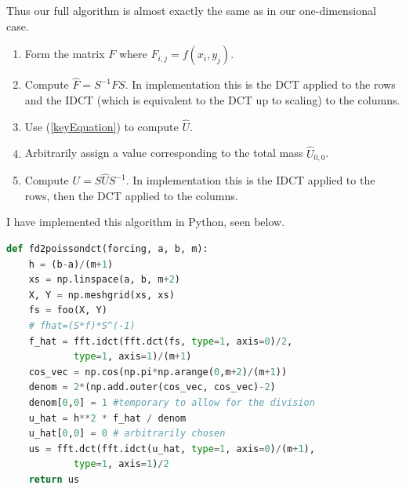 \documentclass[12pt]{article}
\begin{document}
Thus our full algorithm is almost exactly the same as in our one-dimensional case.
\begin{enumerate}
	\item Form the matrix $F$ where $F_{i,j} = f(x_i, y_j)$.
	\item Compute $\hat{F} = S^{-1}FS$. In implementation this is the DCT applied to the rows and the IDCT (which is equivalent to the DCT up to scaling) to the columns. 
	\item Use (\ref{keyEquation}) to compute $\hat{U}$.
	\item Arbitrarily assign a value corresponding to the total mass $\hat{U}_{0,0}$.
	\item Compute $U = S\hat{U}S^{-1}$. In implementation this is the IDCT applied to the rows, then the DCT applied to the columns.
\end{enumerate}
I have implemented this algorithm in Python, seen below.

\begin{lstlisting}[language=Python]
def fd2poissondct(forcing, a, b, m):
	h = (b-a)/(m+1)
	xs = np.linspace(a, b, m+2)
	X, Y = np.meshgrid(xs, xs)
	fs = foo(X, Y)
	# fhat=(S*f)*S^(-1)
	f_hat = fft.idct(fft.dct(fs, type=1, axis=0)/2,
			type=1, axis=1)/(m+1)
	cos_vec = np.cos(np.pi*np.arange(0,m+2)/(m+1))
	denom = 2*(np.add.outer(cos_vec, cos_vec)-2)
	denom[0,0] = 1 #temporary to allow for the division
	u_hat = h**2 * f_hat / denom
	u_hat[0,0] = 0 # arbitrarily chosen
	us = fft.dct(fft.idct(u_hat, type=1, axis=0)/(m+1),
			type=1, axis=1)/2
	return us
\end{lstlisting}
\end{document}
